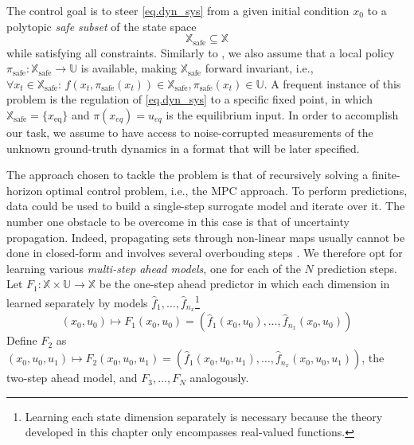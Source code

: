 The control goal is to steer \eqref{eq.dyn_sys} from a given initial condition $x_0$ to a polytopic \textit{safe subset} of the state space
\begin{equation}
	\mathbb{X}_{\text{safe}} \subseteq \mathbb{X}
\end{equation}
while satisfying all constraints. Similarly to \cite{koller2018learning}, we also assume that a local policy $\pi_{\text{safe}}:\mathbb{X}_{\text{safe}} \rightarrow \mathbb{U}$ is available, making $\mathbb{X}_{\text{safe}}$ forward invariant, i.e., $\forall x_t \in \mathbb{X}_{\text{safe}}: \, f(x_t,\pi_{\text{safe}}(x_t)) \in \mathbb{X}_{\text{safe}}, \pi_{\text{safe}}(x_t) \in \mathbb{U}$. A frequent instance of this problem is the regulation of \eqref{eq.dyn_sys} to a specific fixed point, in which $\mathbb{X}_{\text{safe}} = \{x_{\text{eq}}\}$ and $\pi(x_{eq}) = u_{eq}$ is the equilibrium input. In order to accomplish our task, we assume to have access to noise-corrupted measurements of the unknown ground-truth dynamics in a format that will be later specified.

The approach chosen to tackle the problem is that of recursively solving a finite-horizon optimal control problem, i.e., the MPC approach. To perform predictions, data could be used to build a single-step surrogate model and iterate over it. The number one obstacle to be overcome in this case is that of uncertainty propagation. Indeed, propagating sets through non-linear maps usually cannot be done in closed-form and involves several overbouding steps \citep{koller2018learning}. We therefore opt for learning various \textit{multi-step ahead models}, one for each of the $N$ prediction steps. Let $F_1: \mathbb{X} \times \mathbb{U} \rightarrow \mathbb{X}$ be the one-step ahead predictor in which each dimension in learned separately by models $\hat f_1, \dots, \hat f_{n_x}$\footnote{Learning each state dimension separately is necessary because the theory developed in this chapter only encompasses real-valued functions.}
\begin{equation}
	(x_0,u_0) \mapsto F_1(x_0,u_0) = \left( \hat{f}_1(x_0,u_0), \dots, \hat{f}_{n_x}(x_0,u_0)\right)
\end{equation}
Define $F_2$ as $(x_0,u_0,u_1) \mapsto F_2(x_0,u_0,u_1) = \left( \hat{f}_1(x_0,u_0,u_1), \dots, \hat{f}_{n_x}(x_0,u_0,u_1)\right)$, the two-step ahead model, and $F_3,\dots,F_N$ analogously. 


